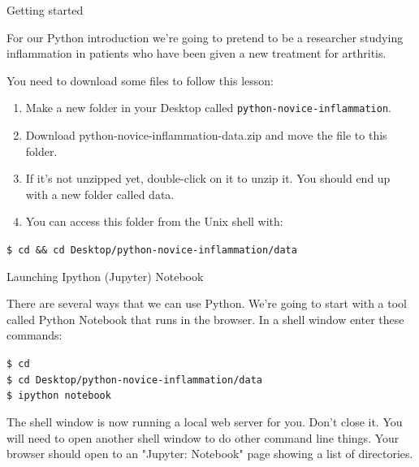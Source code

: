 \documentclass{beamer}
\begin{document}
\begin{frame}{Getting started}

\small{For our Python introduction we're going to pretend to be a researcher studying inflammation in patients who have been given a new treatment for arthritis.}
\vspace{0.5cm}

You need to download some files to follow this lesson:
\begin{enumerate}
 \item{Make a new folder in your Desktop called \texttt{python-novice-inflammation}.}
    \item{Download python-novice-inflammation-data.zip and move the file to this folder.}
    \item{If it's not unzipped yet, double-click on it to unzip it. You should end up with a new folder called data.}
   \item{You can access this folder from the Unix shell with:}
\end{enumerate}
\texttt{\$ cd \&\& cd Desktop/python-novice-inflammation/data}




\end{frame}


\begin{frame}{Launching Ipython (Jupyter) Notebook}

\small{There are several ways that we can use Python.  We're going to start with
a tool called Python Notebook that runs in the browser.
In a shell window enter these commands:}

\vspace{0.5cm}

\begin{beamerboxesrounded}[upper=uppercolgreen,lower=lowercolgreen,shadow=false]{}
\texttt{\$ cd \\
\$ cd Desktop/python-novice-inflammation/data \\
\$ ipython notebook}
\end{beamerboxesrounded}
\vspace{0.5cm}

\small{The shell window is now running a local web server for you.  Don't close it. You will need to open another shell window to do other command line things. Your browser should open to an "Jupyter:  Notebook" page showing a list of directories.}
\end{frame}
\end{document}
